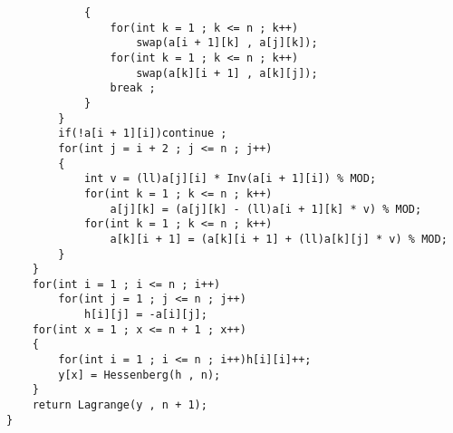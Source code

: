 \begin{verbatim}
            {
                for(int k = 1 ; k <= n ; k++)
                    swap(a[i + 1][k] , a[j][k]);
                for(int k = 1 ; k <= n ; k++)
                    swap(a[k][i + 1] , a[k][j]);
                break ;
            }
        }
        if(!a[i + 1][i])continue ;
        for(int j = i + 2 ; j <= n ; j++)
        {
            int v = (ll)a[j][i] * Inv(a[i + 1][i]) % MOD;
            for(int k = 1 ; k <= n ; k++)
                a[j][k] = (a[j][k] - (ll)a[i + 1][k] * v) % MOD;
            for(int k = 1 ; k <= n ; k++)
                a[k][i + 1] = (a[k][i + 1] + (ll)a[k][j] * v) % MOD;
        }
    }
    for(int i = 1 ; i <= n ; i++)
        for(int j = 1 ; j <= n ; j++)
            h[i][j] = -a[i][j];
    for(int x = 1 ; x <= n + 1 ; x++)
    {
        for(int i = 1 ; i <= n ; i++)h[i][i]++;
        y[x] = Hessenberg(h , n);
    }
    return Lagrange(y , n + 1);
}
\end{verbatim}
